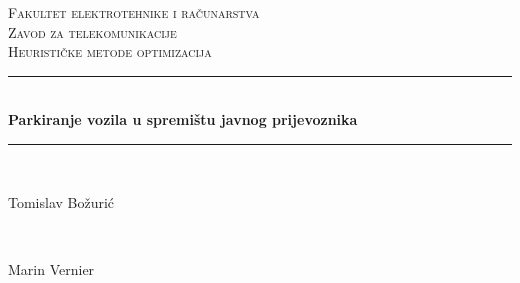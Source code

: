 \documentclass[11pt]{article}
\begin{document}

\begin{titlepage} %
	\newcommand{\HRule}{\rule{\linewidth}{0.5mm}} %
	
	\center %
	
	
	\textsc{\LARGE Fakultet elektrotehnike i računarstva}\\[1.5cm] %
	
	\textsc{\Large Zavod za telekomunikacije}\\[0.5cm] %
	
	\textsc{\large Heurističke metode optimizacija}\\[0.5cm] %
	
	
	\HRule\\[0.4cm]
	
	{\huge\bfseries Parkiranje vozila u spremištu javnog prijevoznika}\\[0.4cm] %
	
	\HRule\\[1.5cm]
	
	
	\begin{minipage}{0.4\textwidth}
		\begin{flushleft}
			\large
			{Tomislav Božurić}
		\end{flushleft}
	\end{minipage}
	~
	\begin{minipage}{0.4\textwidth}
		\begin{flushright}
			\large
			 {Marin Vernier} %
		\end{flushright}
	\end{minipage}
	

\end{titlepage}
\end{document}
